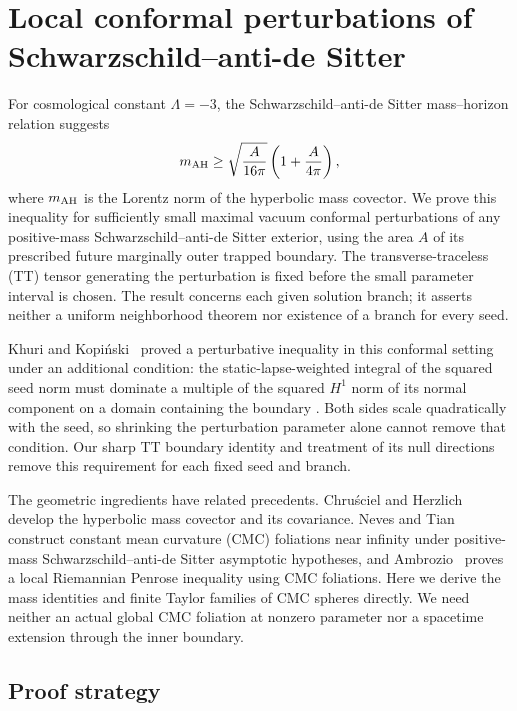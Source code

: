 \section{Local conformal perturbations of Schwarzschild--anti-de Sitter}
\label{ads:sec:introduction}

For cosmological constant $\Lambda=-3$, the
Schwarzschild--anti-de Sitter mass--horizon relation suggests
\begin{equation}\label{ads:eq:intro-penrose}
 m_{\mathrm{AH}}\geq
 \sqrt{\frac{A}{16\pi}}\left(1+\frac{A}{4\pi}\right),
\end{equation}
where $m_{\mathrm{AH}}$ is the Lorentz norm of the hyperbolic mass covector.
We prove this inequality for sufficiently small maximal vacuum
conformal perturbations of any positive-mass Schwarzschild--anti-de
Sitter exterior, using the area $A$ of its prescribed future marginally
outer trapped boundary. The transverse-traceless (TT) tensor generating
the perturbation is fixed before the small parameter interval is
chosen. The result concerns each given solution branch;
it asserts neither a uniform neighborhood theorem nor existence of a
branch for every seed.

Khuri and Kopi\'nski~\cite[Theorem~2]{KhuriKopinski2023} proved a
perturbative inequality in this conformal setting under an additional
condition: the static-lapse-weighted integral of the squared seed norm
must dominate a multiple of the squared $H^1$ norm of its normal
component on a domain containing the boundary
\cite[Equation~(2.5)]{KhuriKopinski2023}. Both sides scale quadratically
with the seed, so shrinking the perturbation parameter alone cannot
remove that condition. Our sharp TT boundary identity and treatment
of its null directions remove this requirement for each fixed seed
and branch.

The geometric ingredients have related precedents.
Chru\'sciel and Herzlich~\cite{ChruscielHerzlich2003} develop the
hyperbolic mass covector and its covariance. Neves and
Tian~\cite{NevesTian2009} construct constant mean curvature (CMC)
foliations near infinity under positive-mass
Schwarzschild--anti-de Sitter asymptotic hypotheses, and
Ambrozio~\cite{Ambrozio2015} proves a local Riemannian Penrose
inequality using CMC foliations. Here we derive the mass identities
and finite Taylor families of CMC spheres directly. We need neither
an actual global CMC foliation at nonzero parameter nor a spacetime
extension through the inner boundary.

\subsection*{Proof strategy}

